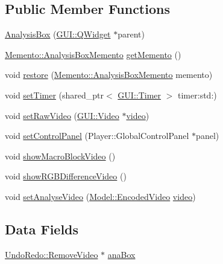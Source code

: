 \subsection*{Public Member Functions}
\begin{DoxyCompactItemize}
\item 
\hyperlink{classGUI_1_1AnalysisBox_a8c06588ec643fff93a0c637d2d662759}{Analysis\+Box} (\hyperlink{classGUI_1_1QWidget}{G\+U\+I\+::\+Q\+Widget} $\ast$parent)
\item 
\hyperlink{classMemento_1_1AnalysisBoxMemento}{Memento\+::\+Analysis\+Box\+Memento} \hyperlink{classGUI_1_1AnalysisBox_a73fa952c3fb3509d83ca1dadc7cefb33}{get\+Memento} ()
\item 
void \hyperlink{classGUI_1_1AnalysisBox_a70c1d51815b73ad12b08cbf0636e77eb}{restore} (\hyperlink{classMemento_1_1AnalysisBoxMemento}{Memento\+::\+Analysis\+Box\+Memento} memento)
\item 
void \hyperlink{classGUI_1_1AnalysisBox_a678bedcbfc074efd29b5587a753fc341}{set\+Timer} (shared\+\_\+ptr$<$ \hyperlink{classGUI_1_1Timer}{G\+U\+I\+::\+Timer} $>$ timer\+:std\+:)
\item 
void \hyperlink{classGUI_1_1AnalysisBox_aa08759618dc05b98d60dc8942d41b556}{set\+Raw\+Video} (\hyperlink{classGUI_1_1Video}{G\+U\+I\+::\+Video} $\ast$\hyperlink{classGUI_1_1AnalysisBox_a226620d1252c162814ca98d3e522255c}{video})
\item 
void \hyperlink{classGUI_1_1AnalysisBox_a9c1b482d1dcd6a733b84a9cdcc960263}{set\+Control\+Panel} (Player\+::\+Global\+Control\+Panel $\ast$panel)
\item 
void \hyperlink{classGUI_1_1AnalysisBox_a9484911b10192b865138995df1158d7e}{show\+Macro\+Block\+Video} ()
\item 
void \hyperlink{classGUI_1_1AnalysisBox_a17b13bec505d0e1f579bdfa7f691f085}{show\+R\+G\+B\+Difference\+Video} ()
\item 
void \hyperlink{classGUI_1_1AnalysisBox_ab047270e0ea8ceb6504fb52d7b06dade}{set\+Analyse\+Video} (\hyperlink{classModel_1_1EncodedVideo}{Model\+::\+Encoded\+Video} \hyperlink{classGUI_1_1AnalysisBox_a226620d1252c162814ca98d3e522255c}{video})
\end{DoxyCompactItemize}
\subsection*{Data Fields}
\begin{DoxyCompactItemize}
\item 
\hyperlink{classUndoRedo_1_1RemoveVideo}{Undo\+Redo\+::\+Remove\+Video} $\ast$ \hyperlink{classGUI_1_1AnalysisBox_a2872ec622eeebd8ec665f83b2eafa7b5}{ana\+Box}
\end{DoxyCompactItemize}
